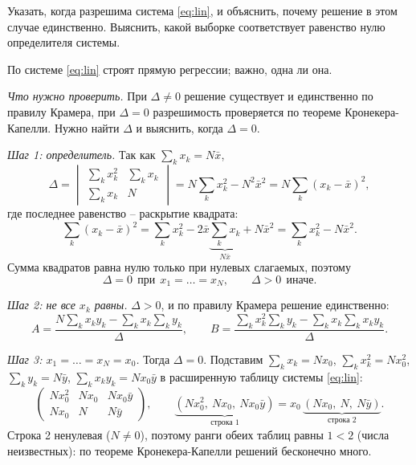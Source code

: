 \documentclass[12pt,a4paper]{article}
\begin{document}
\treb Указать, когда разрешима система \eqref{eq:lin}, и объяснить, почему
решение в этом случае единственно. Выяснить, какой выборке соответствует
равенство нулю определителя системы.

\zachem По системе \eqref{eq:lin} строят прямую регрессии; важно, одна ли она.

\resh \emph{Что нужно проверить.} При $\Delta \ne 0$ решение существует и
единственно по правилу Крамера, при $\Delta = 0$ разрешимость проверяется по
теореме Кронекера-Капелли. Нужно найти $\Delta$ и выяснить, когда $\Delta = 0$.

\emph{Шаг 1: определитель.} Так как $\sum_k x_k = N\bar x$,
\[
  \Delta = \begin{vmatrix} \sum_k x_k^2 & \sum_k x_k\\[1mm] \sum_k x_k & N \end{vmatrix}
  = N\sum_k x_k^2 - N^2\bar x^2
  = N\sum_k (x_k - \bar x)^2 ,
\]
где последнее равенство -- раскрытие квадрата:
\[
  \sum_k (x_k - \bar x)^2
  = \sum_k x_k^2 - 2\bar x\underbrace{\sum_k x_k}_{N\bar x} + N\bar x^2
  = \sum_k x_k^2 - N\bar x^2 .
\]
Сумма квадратов равна нулю только при нулевых слагаемых, поэтому
\[
  \Delta = 0 \ \ \text{при}\ \ x_1 = \dots = x_N,
  \qquad
  \Delta > 0 \ \ \text{иначе}.
\]

\emph{Шаг 2: не все $x_k$ равны.} $\Delta > 0$, и по правилу Крамера
решение единственно:
\[
  A = \frac{N\sum_k x_ky_k - \sum_k x_k\sum_k y_k}{\Delta},
  \qquad
  B = \frac{\sum_k x_k^2\sum_k y_k - \sum_k x_k\sum_k x_ky_k}{\Delta} .
\]

\emph{Шаг 3: $x_1 = \dots = x_N = x_0$.} Тогда $\Delta = 0$. Подставим
$\sum_k x_k = Nx_0$, $\sum_k x_k^2 = Nx_0^2$, $\sum_k y_k = N\bar y$,
$\sum_k x_ky_k = Nx_0\bar y$ в расширенную таблицу системы \eqref{eq:lin}:
\[
  \left(\begin{array}{cc|c}
    Nx_0^2 & Nx_0 & Nx_0\bar y\\
    Nx_0 & N & N\bar y
  \end{array}\right),
  \qquad
  \underbrace{(Nx_0^2,\ Nx_0,\ Nx_0\bar y)}_{\text{строка 1}}
  = x_0\,\underbrace{(Nx_0,\ N,\ N\bar y)}_{\text{строка 2}} .
\]
Строка 2 ненулевая ($N \ne 0$), поэтому ранги обеих таблиц равны $1 < 2$
(числа неизвестных): по теореме Кронекера-Капелли решений бесконечно много.
\end{document}
